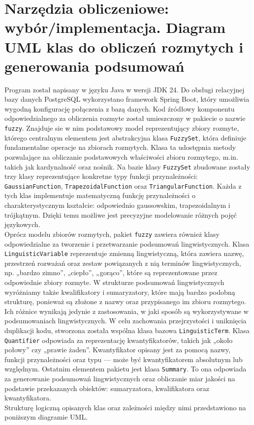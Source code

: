 \documentclass{article}
\begin{document}
\section{Narzędzia obliczeniowe: wybór/implementacja. Diagram UML klas do obliczeń rozmytych i generowania podsumowań}
Program został napisany w języku Java w wersji JDK 24. Do obsługi relacyjnej bazy danych PostgreSQL wykorzystano framework Spring Boot, który umożliwia wygodną konfigurację połączenia z bazą danych. Kod źródłowy komponentu odpowiedzialnego za obliczenia rozmyte został umieszczony w pakiecie o nazwie \texttt{fuzzy}. Znajduje sie w nim podstawowy model reprezentujący zbiory rozmyte, którego centralnym elementem jest abstrakcyjna klasa \texttt{FuzzySet}, która definiuje fundamentalne operacje na zbiorach rozmytych. Klasa ta udostępnia metody pozwalające na obliczanie podstawowych właściwości zbioru rozmytego, m.in. takich jak kardynalność oraz nośnik. Na bazie klasy \texttt{FuzzySet} zbudowane zostały trzy klasy reprezentujące konkretne typy funkcji przynależności: \texttt{GaussianFunction}, \texttt{TrapezoidalFunction} oraz \texttt{TriangularFunction}. Każda z tych klas implementuje matematyczną funkcję przynależności o charakterystycznym kształcie: odpowiednio gaussowskim, trapezoidalnym i trójkątnym. Dzięki temu możliwe jest precyzyjne modelowanie różnych pojęć językowych. \\
Oprócz modelu zbiorów rozmytych, pakiet \texttt{fuzzy} zawiera również klasy odpowiedzialne za tworzenie i przetwarzanie podsumowań lingwistycznych. Klasa \texttt{LinguisticVariable} reprezentuje zmienną lingwistyczną, która zawiera nazwę, przestrzeń rozważań oraz zestaw powiązanych z nią terminów lingwistycznych, np. „bardzo zimno”, „ciepło”, „gorąco”, które są reprezentowane przez odpowiednie zbiory rozmyte.
W strukturze podsumowań lingwistycznych wyróżniamy także kwalifikatory i sumaryzatory, które mają bardzo podobną strukturę, ponieważ są złożone z nazwy oraz przypisanego im zbioru rozmytego. Ich różnice wynikają jedynie z zastosowania, w jaki sposób są wykorzystywane w podsumowaniach lingwistycznych. W celu zachowania przejrzystości i uniknięcia duplikacji kodu, stworzona została wspólna klasa bazowa \texttt{LinguisticTerm}. 
Klasa \texttt{Quantifier} odpowiada za reprezentację kwantyfikatorów, takich jak „około połowy” czy „prawie żaden”. Kwantyfikator opisany jest za pomocą nazwy, funkcji przynależności oraz typu — może być kwantyfikatorem absolutnym lub względnym.
Ostatnim elementem pakietu jest klasa \texttt{Summary}. To ona odpowiada za generowanie podsumowań lingwistycznych oraz obliczanie miar jakości na podstawie przekazanych obiektów: sumaryzatora, kwalifikatora oraz kwantyfikatora. \\
Strukturę logiczną opisanych klas oraz zależności między nimi przedstawiono na poniższym diagramie UML.
\end{document}
